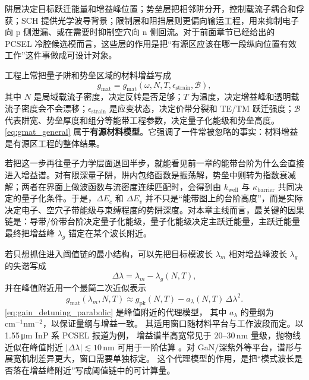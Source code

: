 阱层决定目标跃迁能量和增益峰位置；势垒层把相邻阱分开，控制载流子耦合和俘获；SCH 提供光学波导背景；限制层和阻挡层则更偏向输运工程，用来抑制电子向 p 侧泄漏、或在需要时抑制空穴向 n 侧回流。对于前面章节已经给出的 PCSEL 冷腔候选模而言，这些层的作用是把“有源区应该在哪一段纵向位置有效工作”这件事做成可设计对象。

工程上常把量子阱和势垒区域的材料增益写成
\begin{equation}
 g_{\mathrm{mat}} = g_{\mathrm{mat}}(\omega, N, T, \epsilon_{\mathrm{strain}}, \mathcal{B}),
\label{eq:gmat_general}
\end{equation}
其中 $N$ 是局域载流子密度，决定反转是否足够；$T$ 为温度，决定增益峰和透明载流子密度会不会漂移；$\epsilon_{\mathrm{strain}}$ 是应变状态，决定价带分裂和 TE/TM 跃迁强度；$\mathcal{B}$ 代表阱宽、势垒厚度和组分等能带工程参数，决定量子化能级和势垒高度。\cref{eq:gmat_general} 属于\textbf{有源材料模型}。它强调了一件常被忽略的事实：材料增益是有源区工程的整体结果。

若把这一步再往量子力学层面退回半步，就能看见前一章的能带台阶为什么会直接进入增益谱。对有限深量子阱，阱内包络函数是振荡解，势垒中则转为指数衰减解；两者在界面上做波函数与流密度连续匹配时，会得到由 $k_{\mathrm{well}}$ 与 $\kappa_{\mathrm{barrier}}$ 共同决定的量子化条件。于是，$\Delta E_c$ 和 $\Delta E_v$ 并不只是“能带图上的台阶高度”，而是实际决定电子、空穴子带能级与束缚程度的势阱深度。对本章主线而言，最关键的因果链是：导带/价带台阶决定量子化能级，量子化能级决定主跃迁能量，主跃迁能量最终把增益峰 $\lambda_g$ 锚定在某个波长附近。

若只想抓住进入阈值链的最小结构，可以先把目标模波长 $\lambda_m$ 相对增益峰波长 $\lambda_g$ 的失谐写成
\begin{equation}
\Delta\lambda=\lambda_m-\lambda_g(N,T),
\label{eq:gain_detuning_def}
\end{equation}
并在峰值附近用一个最简二次近似表示
\begin{equation}
g_{\mathrm{mat}}(\lambda_m,N,T)
\approx
g_{\mathrm{pk}}(N,T)
-a_{\lambda}(N,T)\,\Delta\lambda^2.
\label{eq:gain_detuning_parabolic}
\end{equation}
\cref{eq:gain_detuning_parabolic} 是峰值附近的代理模型，
其中 $a_{\lambda}$ 的量纲为 $\mathrm{cm}^{-1}\mathrm{nm}^{-2}$，以保证量纲与增益一致。
其适用窗口随材料平台与工作波段而定。以 1.55\,\si{\micro\meter} InP 系 PCSEL 报道为例，
增益谱半高宽常见于 $20$--$30\,\mathrm{nm}$ 量级，抛物线近似在峰值附近
$|\Delta\lambda|\lesssim10\,\mathrm{nm}$ 可用于一阶估算
\cite{wang2024,zhou2024nside1550pcsel}。对 GaN/深紫外等平台，谱形与展宽机制差异更大，窗口需要单独标定\cite{coldren2012,lu2025deepuvpcsel}。
这个代理模型的作用，是把“模式波长是否落在增益峰附近”写成阈值链中的可计算量。

